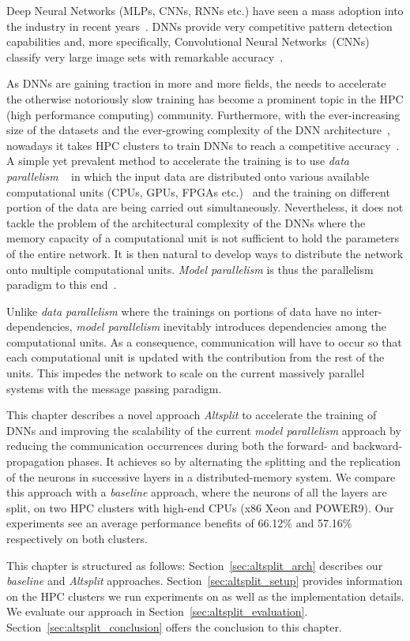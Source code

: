 Deep Neural Networks (MLPs, CNNs, RNNs etc.) have seen a mass adoption into the
industry in recent years~\cite{Acoustic, Language, Ciregan2012}. DNNs provide
very competitive pattern detection capabilities and, more specifically,
Convolutional Neural Networks~(CNNs) classify very large image sets with
remarkable accuracy~\cite{Krizhevsky2012}. 

As DNNs are gaining traction in more and more fields, the needs to accelerate
the otherwise notoriously slow training has become a prominent topic in the
HPC (high performance computing) community. 
Furthermore, with the ever-increasing size of the datasets and the
ever-growing complexity of the DNN architecture~\cite{resnet, Inception,
transformersXL}, nowadays it takes HPC clusters to train DNNs to reach a
competitive accuracy~\cite{model0}. A simple yet prevalent method to
accelerate the training is to use \emph{data parallelism} ~\cite{model1,
pserver} in which the input data are distributed onto various available
computational units (CPUs, GPUs, FPGAs etc.)~\cite{You17, fpga_dnn, tpu} and
the training on different portion of the data are being carried out
simultaneously. Nevertheless, it does not tackle the problem of the
architectural complexity of the DNNs where the memory capacity of a
computational unit is not sufficient to hold the parameters of the entire
network. It is then natural to develop ways to distribute the network onto
multiple computational units. \emph{Model parallelism} is thus the
parallelism paradigm to this end~\cite{model0,model1}.

Unlike \emph{data parallelism} where the trainings on portions of data have
no inter-dependencies, \emph{model parallelism} inevitably introduces
dependencies among the computational units. As a consequence, communication
will have to occur so that each computational unit is updated with the
contribution from the rest of the units. This impedes the network to scale on
the current massively parallel systems with the message passing paradigm.

This chapter describes a novel approach \emph{Altsplit} to accelerate the
training of DNNs and improving the scalability of the current \emph{model 
parallelism} approach by reducing the communication occurrences during both the
forward- and backward- propagation phases. It achieves so by alternating the
splitting and the replication of the neurons in successive layers in a
distributed-memory system. We compare this approach with a \emph{baseline}
approach, where the neurons of all the layers are split, on two HPC clusters
with high-end CPUs (x86 Xeon and POWER9). Our experiments see an average
performance benefits of 66.12\% and 57.16\% respectively on both clusters.

This chapter is structured as follows: Section~\ref{sec:altsplit_arch} describes 
our \emph{baseline} and \emph{Altsplit} approaches. 
Section~\ref{sec:altsplit_setup} provides information on the HPC clusters we run 
experiments on as well as the implementation details. We evaluate our approach 
in Section~\ref{sec:altsplit_evaluation}.
Section~\ref{sec:altsplit_conclusion} offers the conclusion to this chapter.
